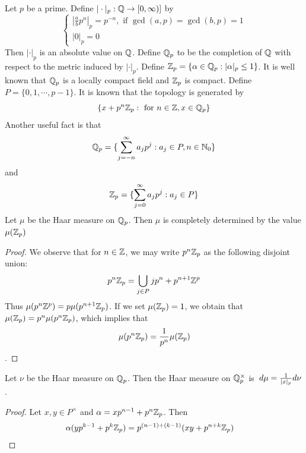\documentclass{book}
\begin{document}
	\begin{ex}  
		Let $p$ be a prime. Define $|\cdot |_p: \mathbb{Q} \rightarrow [0, \infty)]$ by 
		\[
		\begin{cases}
			|\frac{a}{b}p^n|_p = p^{-n}, \text{ if } \gcd(a,p) = \gcd(b,p) = 1 \\
			|0|_p = 0
		\end{cases}
		\]
		Then $|\cdot|_p$ is an absolute value on $\mathbb{Q}$. Define $\mathbb{Q}_p$ to be the completion of $\mathbb{Q}$ with respect to the metric induced by $|\cdot|_p$. Define $\mathbb{Z}_p = \{\alpha \in \mathbb{Q}_p: |\alpha|_p \leq 1 \}$. It is well known that $\mathbb{Q}_p$ is a locally compact field and $\mathbb{Z}_p$ is compact. Define $P = \{0, 1, \cdots, p-1\}$. It is known that the topology is generated by  $$\{x + p^n\mathbb{Z}_p: \text{ for } n \in \mathbb{Z}, x \in \mathbb{Q}_p\}$$ Another useful fact is that $$\mathbb{Q}_p = \{\sum\limits_{j = -n}^{\infty} a_jp^j : a_j \in P, n \in \mathbb{N}_0\}$$ and $$\mathbb{Z}_p = \{\sum\limits_{j = 0}^{\infty} a_jp^j : a_j \in P\}$$ 
		Let $\mu$ be the Haar measure on $\mathbb{Q}_p$. Then $\mu$ is completely determined by the value $\mu(\mathbb{Z}_p)$  
	\end{ex}

	\begin{proof}
		We observe that for $n \in \mathbb{Z}$, we may write $p^n \mathbb{Z}_p$ as the following disjoint union: $$p^n\mathbb{Z}_p = \bigcup\limits_{j \in P} jp^n + p^{n+1}\mathbb{Z}^p$$ Thus $\mu(p^n \mathbb{Z}^{p}) = p \mu(p^{n+1}\mathbb{Z}_p)$. If we set $\mu(\mathbb{Z}_p) = 1$, we obtain that $\mu(\mathbb{Z}_p) = p^n \mu(p^n\mathbb{Z}_p)$, which implies that $$\mu(p^n \mathbb{Z}_p) = \frac{1}{p^n}\mu(\mathbb{Z}_p)$$.  
	\end{proof}
	
	\begin{ex}  
		Let $\nu$ be the Haar measure on $\mathbb{Q}_p$. Then the Haar measure on $\mathbb{Q}_p^{\times}$  is $\, d \mu = \frac{1}{|x|_p}d \nu$.
	\end{ex}

	\begin{proof}
		Let $x, y \in P^{\times}$ and $\alpha = xp^{n-1} + p^n\mathbb{Z}_p$. Then 
		\begin{align*}
			\alpha (yp^{k-1} + p^k \mathbb{Z}_p) 
			& = p^{(n-1)+ (k-1)}(xy + p^{n+k} \mathbb{Z}_p) 
		\end{align*}
	\end{proof}
	
	
	
	
	
	
	
	
	
	
	
	
	
	
	
\end{document}
